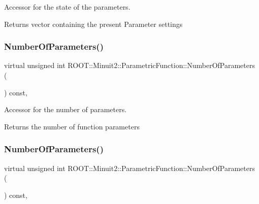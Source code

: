 Accessor for the state of the parameters.

\begin{DoxyReturn}{Returns}
vector containing the present Parameter settings 
\end{DoxyReturn}
\mbox{\label{classROOT_1_1Minuit2_1_1ParametricFunction_a8e5e21de5e8f6e5bedd1ae7ea27b24ac}} 
\subsubsection{\texorpdfstring{NumberOfParameters()}{NumberOfParameters()}\hspace{0.1cm}{\footnotesize\ttfamily [1/3]}}
{\footnotesize\ttfamily virtual unsigned int R\+O\+O\+T\+::\+Minuit2\+::\+Parametric\+Function\+::\+Number\+Of\+Parameters (\begin{DoxyParamCaption}{ }\end{DoxyParamCaption}) const\hspace{0.3cm}{\ttfamily [inline]}, {\ttfamily [virtual]}}

Accessor for the number of parameters.

\begin{DoxyReturn}{Returns}
the number of function parameters 
\end{DoxyReturn}
\mbox{\label{classROOT_1_1Minuit2_1_1ParametricFunction_a8e5e21de5e8f6e5bedd1ae7ea27b24ac}} 
\subsubsection{\texorpdfstring{NumberOfParameters()}{NumberOfParameters()}\hspace{0.1cm}{\footnotesize\ttfamily [2/3]}}
{\footnotesize\ttfamily virtual unsigned int R\+O\+O\+T\+::\+Minuit2\+::\+Parametric\+Function\+::\+Number\+Of\+Parameters (\begin{DoxyParamCaption}{ }\end{DoxyParamCaption}) const\hspace{0.3cm}{\ttfamily [inline]}, {\ttfamily [virtual]}}

